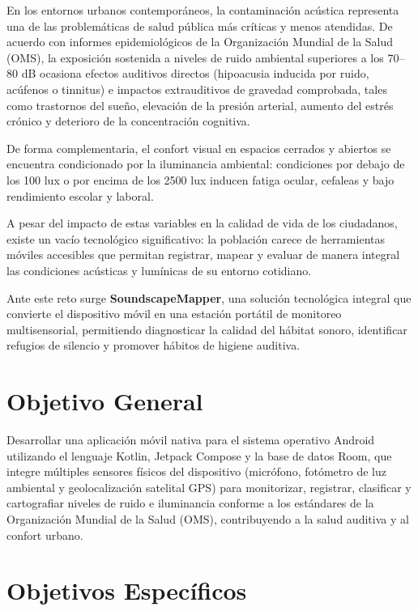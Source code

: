 \documentclass[12pt,a4paper]{article}
\begin{document}
En los entornos urbanos contemporáneos, la contaminación acústica representa una de las problemáticas de salud pública más críticas y menos atendidas. De acuerdo con informes epidemiológicos de la Organización Mundial de la Salud (OMS), la exposición sostenida a niveles de ruido ambiental superiores a los 70--80 dB ocasiona efectos auditivos directos (hipoacusia inducida por ruido, acúfenos o tinnitus) e impactos extrauditivos de gravedad comprobada, tales como trastornos del sueño, elevación de la presión arterial, aumento del estrés crónico y deterioro de la concentración cognitiva.

De forma complementaria, el confort visual en espacios cerrados y abiertos se encuentra condicionado por la iluminancia ambiental: condiciones por debajo de los 100 lux o por encima de los 2500 lux inducen fatiga ocular, cefaleas y bajo rendimiento escolar y laboral.

A pesar del impacto de estas variables en la calidad de vida de los ciudadanos, existe un vacío tecnológico significativo: la población carece de herramientas móviles accesibles que permitan registrar, mapear y evaluar de manera integral las condiciones acústicas y lumínicas de su entorno cotidiano.

Ante este reto surge \textbf{SoundscapeMapper}, una solución tecnológica integral que convierte el dispositivo móvil en una estación portátil de monitoreo multisensorial, permitiendo diagnosticar la calidad del hábitat sonoro, identificar refugios de silencio y promover hábitos de higiene auditiva.

\section{Objetivo General}

Desarrollar una aplicación móvil nativa para el sistema operativo Android utilizando el lenguaje Kotlin, Jetpack Compose y la base de datos Room, que integre múltiples sensores físicos del dispositivo (micrófono, fotómetro de luz ambiental y geolocalización satelital GPS) para monitorizar, registrar, clasificar y cartografiar niveles de ruido e iluminancia conforme a los estándares de la Organización Mundial de la Salud (OMS), contribuyendo a la salud auditiva y al confort urbano.

\section{Objetivos Específicos}
\end{document}
